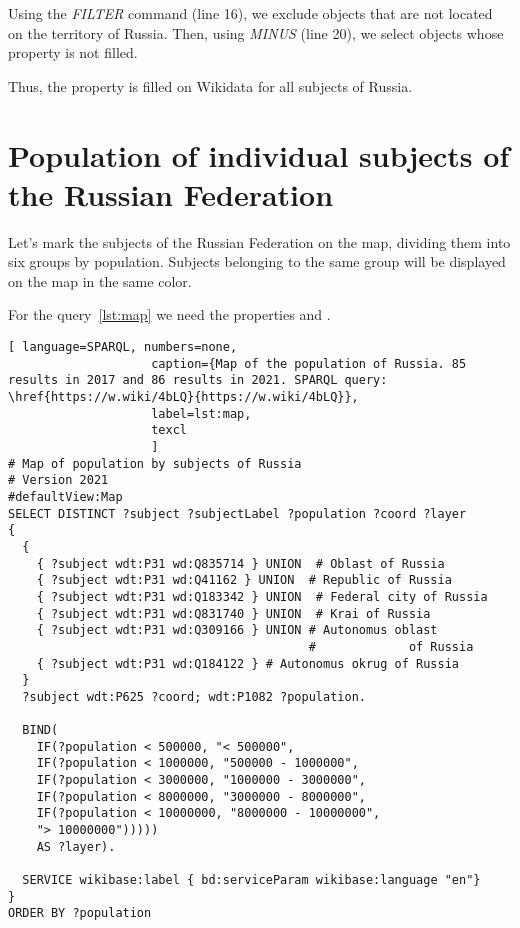 Using the \textit{FILTER} command (line 16), we exclude objects that are not located on the territory of Russia. Then, using \textit{MINUS} (line 20), we select objects whose property  is not filled.

Thus, the  property is filled on Wikidata for all subjects of Russia.

\section{Population of individual subjects of the Russian Federation}

Let's mark the subjects of the Russian Federation on the map, dividing them into six groups by population. Subjects belonging to the same group will be displayed on the map in the same color.

For the query~\protect\ref{lst:map} we need the properties  and .


\begin{lstlisting}[ language=SPARQL, numbers=none,
                    caption={Map of the population of Russia. 85 results in 2017 and 86 results in 2021. SPARQL query: \href{https://w.wiki/4bLQ}{https://w.wiki/4bLQ}},
                    label=lst:map,
                    texcl 
                    ]
# Map of population by subjects of Russia
# Version 2021
#defaultView:Map
SELECT DISTINCT ?subject ?subjectLabel ?population ?coord ?layer
{
  {
    { ?subject wdt:P31 wd:Q835714 } UNION  # Oblast of Russia
    { ?subject wdt:P31 wd:Q41162 } UNION  # Republic of Russia
    { ?subject wdt:P31 wd:Q183342 } UNION  # Federal city of Russia
    { ?subject wdt:P31 wd:Q831740 } UNION  # Krai of Russia
    { ?subject wdt:P31 wd:Q309166 } UNION # Autonomus oblast 
                                          #             of Russia
    { ?subject wdt:P31 wd:Q184122 } # Autonomus okrug of Russia
  }   
  ?subject wdt:P625 ?coord; wdt:P1082 ?population.
  
  BIND(
    IF(?population < 500000, "< 500000",
    IF(?population < 1000000, "500000 - 1000000",
    IF(?population < 3000000, "1000000 - 3000000",
    IF(?population < 8000000, "3000000 - 8000000",
    IF(?population < 10000000, "8000000 - 10000000",
    "> 10000000")))))
    AS ?layer).
  
  SERVICE wikibase:label { bd:serviceParam wikibase:language "en"}
}
ORDER BY ?population
\end{lstlisting}%


